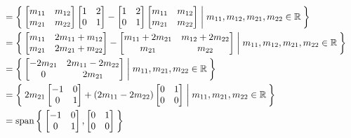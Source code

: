\documentclass[letterpaper,12pt]{article}
\begin{document}
\begin{enumerate}
\begin{align*}
{      } \\
      &= \Set{
        \begin{bmatrix}
          m_{11} & m_{12} \\
          m_{21} & m_{22}
        \end{bmatrix}
        \begin{bmatrix}
          1 & 2 \\
          0 & 1
        \end{bmatrix}
        - \begin{bmatrix}
          1 & 2 \\
          0 & 1
        \end{bmatrix}
        \begin{bmatrix}
          m_{11} & m_{12} \\
          m_{21} & m_{22}
        \end{bmatrix}
        | m_{11}, m_{12}, m_{21}, m_{22} \in \mathbb{R}
      } \\
      &= \Set{
        \begin{bmatrix}
          m_{11} & 2m_{11} + m_{12} \\
          m_{21} & 2m_{21} + m_{22}
        \end{bmatrix} -
        \begin{bmatrix}
          m_{11} + 2m_{21} & m_{12} + 2m_{22} \\
          m_{21} & m_{22}
        \end{bmatrix}
        | m_{11}, m_{12}, m_{21}, m_{22} \in \mathbb{R}
      } \\
      &= \Set{
        \begin{bmatrix}
          -2m_{21} & 2m_{11} - 2m_{22} \\
          0 & 2m_{21}
        \end{bmatrix}
        | m_{11}, m_{21}, m_{22} \in \mathbb{R}
      } \\
      &= \Set{
        2m_{21}\begin{bmatrix}
          -1 & 0 \\
          0 & 1
        \end{bmatrix} +
        (2m_{11} - 2m_{22})\begin{bmatrix}
          0 & 1 \\
          0 & 0
        \end{bmatrix}
        | m_{11}, m_{21}, m_{22} \in \mathbb{R}
      } \\
      &= \text{span}\Set{
        \begin{bmatrix}
          -1 & 0 \\
          0 & 1
        \end{bmatrix},
        \begin{bmatrix}
          0 & 1 \\
          0 & 0
        \end{bmatrix}
      }
    \end{align*}
\end{enumerate}
\end{document}
